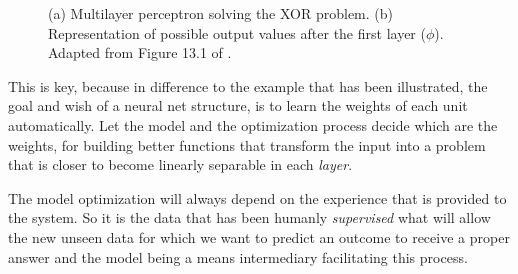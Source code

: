 \documentclass[11pt,english,listoffigures,listoftables]{tfgetsinf}
\begin{document}
\begin{figure}%
    \centering
    \qquad
    \caption{(a) Multilayer perceptron solving the XOR problem. (b) Representation of possible output values after the first layer ($\phi$). Adapted from Figure 13.1 of \cite{pml1Book}. }%
    \label{chap1:xorsolved}%
\end{figure}

This is key, because in difference to the example that has been illustrated, the goal and wish of a neural net structure, is to learn the weights of each unit automatically.
Let the model and the optimization process decide which are the weights, for building better functions that transform the input into a problem that is closer to become linearly separable in each \textit{layer}.

The model optimization will always depend on the experience that is provided to the system. So it is the data that has been humanly \textit{supervised} what will allow the new unseen data for which we want to predict an outcome to receive a proper answer and the model being a means intermediary facilitating this process.
 
\end{document}
